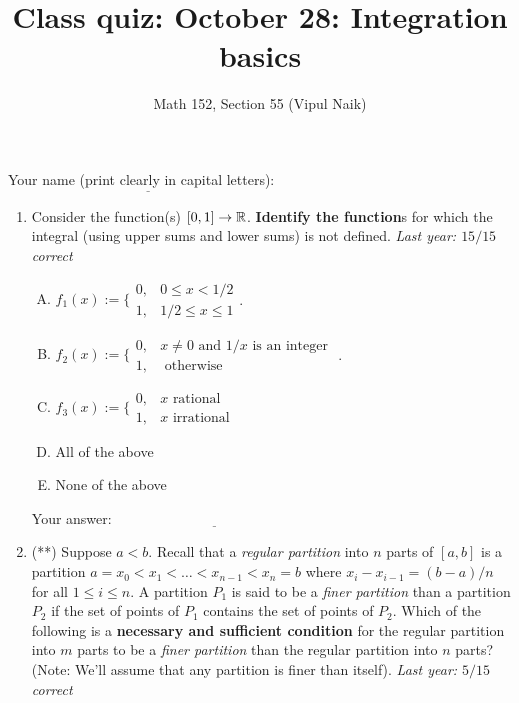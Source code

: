 \documentclass[10pt]{amsart}
\title{Class quiz: October 28: Integration basics}
\author{Math 152, Section 55 (Vipul Naik)}
\begin{document}
\maketitle

Your name (print clearly in capital letters): $\underline{\qquad\qquad\qquad\qquad\qquad\qquad\qquad\qquad\qquad\qquad}$

\begin{enumerate}

\item Consider the function(s) $[0,1] \to \mathbb{R}$. {\bf Identify the
  function}s for which the integral (using upper sums and lower sums)
  is not defined. {\em Last year: $15/15$ correct}

  \begin{enumerate}[(A)]
  \item $f_1(x) := \lbrace\begin{array}{rl} 0, & 0 \le x < 1/2 \\ 1, &
    1/2 \le x \le 1\end{array}$.
  \item $f_2(x) := \lbrace\begin{array}{rl} 0, & x \ne 0 \text{ and } 1/x \text{ is an
    integer } \\ 1, & \text{ otherwise} \end{array}$.
  \item $f_3(x) := \lbrace\begin{array}{rl} 0, & x \text{ rational }\\
    1, & x \text{ irrational}\end{array}$
  \item All of the above
  \item None of the above
  \end{enumerate}

  \vspace{0.1in}
  Your answer: $\underline{\qquad\qquad\qquad\qquad\qquad\qquad\qquad}$
  \vspace{1in}

\item (**) Suppose $a < b$. Recall that a {\em regular partition} into $n$
  parts of $[a,b]$ is a partition $a = x_0 < x_1 < \dots < x_{n-1} <
  x_n = b$ where $x_i - x_{i-1} = (b - a)/n$ for all $1 \le i \le
  n$. A partition $P_1$ is said to be a {\em finer partition} than a
  partition $P_2$ if the set of points of $P_1$ contains the set of
  points of $P_2$. Which of the following is a {\bf necessary and
  sufficient condition} for the regular partition into $m$ parts to be
  a {\em finer partition} than the regular partition into $n$ parts?
  (Note: We'll assume that any partition is finer than itself). {\em
  Last year: $5/15$ correct}


\end{enumerate}
\end{document}

